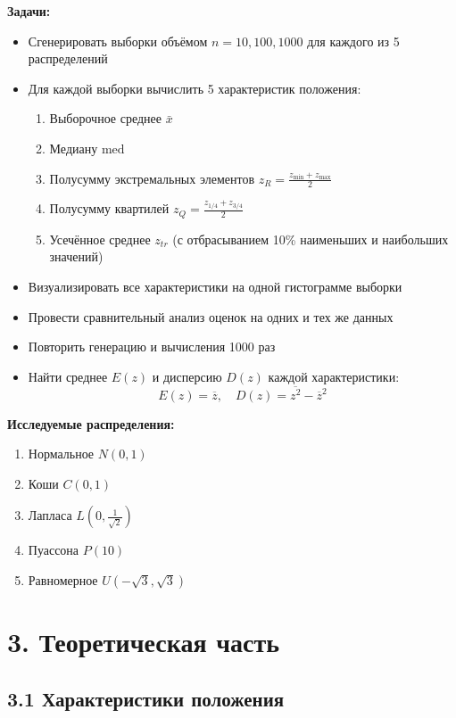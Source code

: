 \documentclass[a4paper,14pt]{extarticle}
\begin{document}
\textbf{Задачи:}
\begin{itemize}
    \item Сгенерировать выборки объёмом $n = 10, 100, 1000$ для каждого из 5 распределений
    \item Для каждой выборки вычислить 5 характеристик положения:
    \begin{enumerate}
        \item Выборочное среднее $\bar{x}$
        \item Медиану $\text{med}$
        \item Полусумму экстремальных элементов $z_R = \frac{z_{\min} + z_{\max}}{2}$
        \item Полусумму квартилей $z_Q = \frac{z_{1/4} + z_{3/4}}{2}$
        \item Усечённое среднее $z_{tr}$ (с отбрасыванием 10\% наименьших и наибольших значений)
    \end{enumerate}
    \item Визуализировать все характеристики на одной гистограмме выборки
    \item Провести сравнительный анализ оценок на одних и тех же данных
    \item Повторить генерацию и вычисления 1000 раз
    \item Найти среднее $E(z)$ и дисперсию $D(z)$ каждой характеристики:
    \begin{equation}
    E(z) = \overline{z}, \quad D(z) = \overline{z^2} - \overline{z}^2
    \end{equation}
\end{itemize}

\textbf{Исследуемые распределения:}
\begin{enumerate}
    \item Нормальное $N(0, 1)$
    \item Коши $C(0, 1)$
    \item Лапласа $L(0, \frac{1}{\sqrt{2}})$
    \item Пуассона $P(10)$
    \item Равномерное $U(-\sqrt{3}, \sqrt{3})$
\end{enumerate}

\section*{3. Теоретическая часть}

\subsection*{3.1 Характеристики положения}
\end{document}
